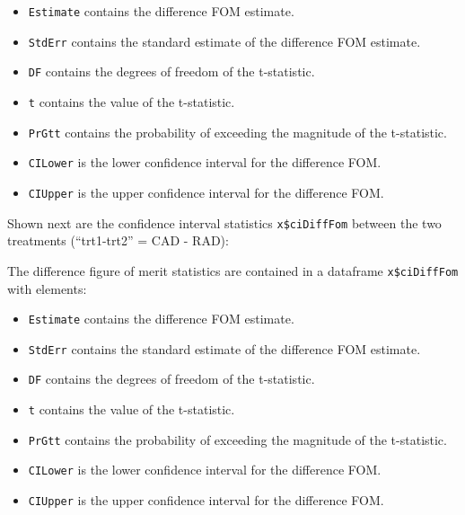 \documentclass[
]{book}
\newenvironment{Shaded}{\begin{snugshade}}{\end{snugshade}}
\newcommand{\CommentTok}[1]{\textcolor[rgb]{0.56,0.35,0.01}{\textit{#1}}}
\newcommand{\KeywordTok}[1]{\textcolor[rgb]{0.13,0.29,0.53}{\textbf{#1}}}
\newcommand{\NormalTok}[1]{#1}
\newcommand{\OperatorTok}[1]{\textcolor[rgb]{0.81,0.36,0.00}{\textbf{#1}}}
\providecommand{\tightlist}{%
  \setlength{\itemsep}{0pt}\setlength{\parskip}{0pt}}
\begin{document}
\begin{itemize}
\tightlist
\item
  \texttt{Estimate} contains the difference FOM estimate.
\item
  \texttt{StdErr} contains the standard estimate of the difference FOM estimate.
\item
  \texttt{DF} contains the degrees of freedom of the t-statistic.
\item
  \texttt{t} contains the value of the t-statistic.
\item
  \texttt{PrGtt} contains the probability of exceeding the magnitude of the t-statistic.
\item
  \texttt{CILower} is the lower confidence interval for the difference FOM.
\item
  \texttt{CIUpper} is the upper confidence interval for the difference FOM.
\end{itemize}

Shown next are the confidence interval statistics \texttt{x\$ciDiffFom} between the two treatments (``trt1-trt2'' = CAD - RAD):

\begin{Shaded}
\end{Shaded}

The difference figure of merit statistics are contained in a dataframe \texttt{x\$ciDiffFom} with elements:

\begin{itemize}
\tightlist
\item
  \texttt{Estimate} contains the difference FOM estimate.
\item
  \texttt{StdErr} contains the standard estimate of the difference FOM estimate.
\item
  \texttt{DF} contains the degrees of freedom of the t-statistic.
\item
  \texttt{t} contains the value of the t-statistic.
\item
  \texttt{PrGtt} contains the probability of exceeding the magnitude of the t-statistic.
\item
  \texttt{CILower} is the lower confidence interval for the difference FOM.
\item
  \texttt{CIUpper} is the upper confidence interval for the difference FOM.
\end{itemize}
\end{document}
